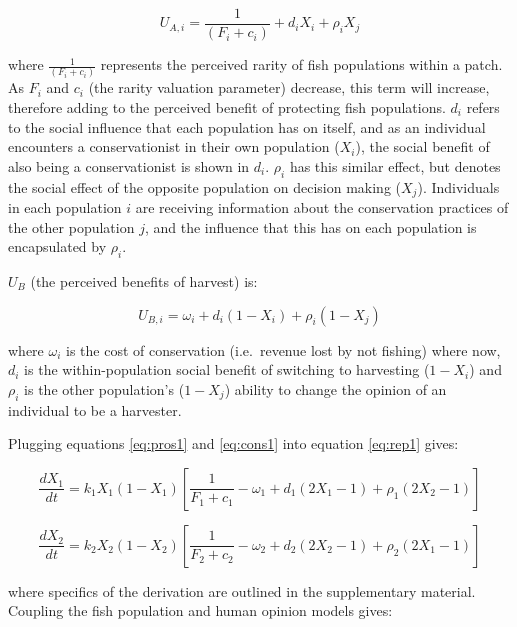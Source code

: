 \documentclass[
  12pt,
]{article}
\begin{document}
\begin{equation} 
U_{A,i} = \frac{1}{(F_i + c_i)} + d_iX_i + \rho_i X_j
  \label{eq:pros1}
\end{equation}

where \(\frac{1}{(F_i + c_i)}\) represents the perceived rarity of fish populations within a patch. As \(F_i\) and \(c_i\) (the rarity valuation parameter) decrease, this term will increase, therefore adding to the perceived benefit of protecting fish populations. \(d_i\) refers to the social influence that each population has on itself, and as an individual encounters a conservationist in their own population (\(X_i\)), the social benefit of also being a conservationist is shown in \(d_i\). \(\rho_i\) has this similar effect, but denotes the social effect of the opposite population on decision making (\(X_j\)). Individuals in each population \(i\) are receiving information about the conservation practices of the other population \(j\), and the influence that this has on each population is encapsulated by \(\rho_i\).

\(U_B\) (the perceived benefits of harvest) is:

\begin{equation} 
U_{B,i} = \omega_i + d_i(1-X_i) + \rho_i(1-X_j)
  \label{eq:cons1}
\end{equation}

where \(\omega_i\) is the cost of conservation (i.e.~revenue lost by not fishing) where now, \(d_i\) is the within-population social benefit of switching to harvesting (\(1-X_i\)) and \(\rho_i\) is the other population's (\(1-X_j\)) ability to change the opinion of an individual to be a harvester.

Plugging equations \eqref{eq:pros1} and \eqref{eq:cons1} into equation \eqref{eq:rep1} gives:

\begin{equation} 
\frac{dX_1}{dt} =  k_1X_1(1-X_1) [\frac{1}{F_1+c_1} - \omega_1 + d_1(2X_1 - 1) + \rho_1(2X_2 - 1)]
  \label{eq:social1}
\end{equation}

\begin{equation} 
\frac{dX_2}{dt} = k_2X_2(1-X_2)  [\frac{1}{F_2+c_2} - \omega_2 + d_2(2X_2 - 1) +  \rho_2(2X_1 - 1)]
  \label{eq:social2}
\end{equation}

where specifics of the derivation are outlined in the supplementary material. Coupling the fish population and human opinion models gives:
\end{document}
